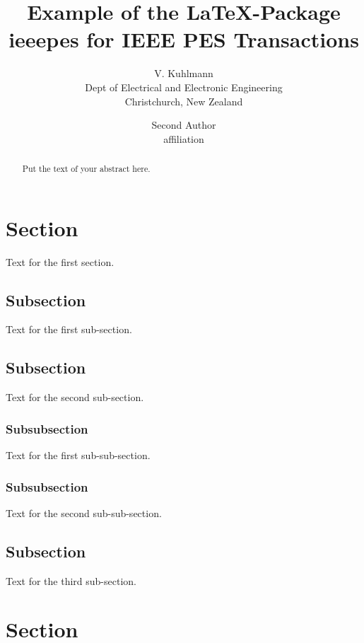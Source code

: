 \documentclass[10pt,twoside%
		,draft%
	]{article}
\title{Example of the \LaTeX-Package ieeepes for IEEE PES Transactions}
\author{
	V. Kuhlmann\\
	Dept of Electrical and Electronic Engineering\\
	Christchurch, New Zealand
\and
	Second Author\\
	affiliation
}
\begin{document}
\maketitle


\begin{abstract}
Put the text of your abstract here.
\end{abstract}



\section{Section}

Text for the first section.


\subsection{Subsection}

Text for the first sub-section.


\subsection{Subsection}

Text for the second sub-section.

\subsubsection{Subsubsection}
Text for the first sub-sub-section.

\subsubsection{Subsubsection}
Text for the second sub-sub-section.


\subsection{Subsection}

Text for the third sub-section.



\section{Section}
\end{document}
